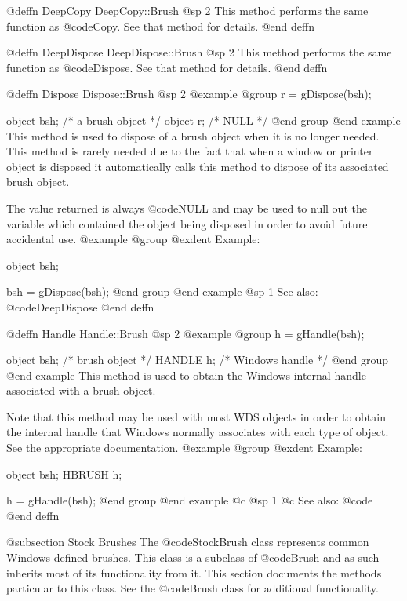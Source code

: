 @deffn {DeepCopy} DeepCopy::Brush
@sp 2
This method performs the same function as @code{Copy}.  See that
method for details.
@end deffn





@deffn {DeepDispose} DeepDispose::Brush
@sp 2
This method performs the same function as @code{Dispose}.  See that
method for details.
@end deffn







@deffn {Dispose} Dispose::Brush
@sp 2
@example
@group
r = gDispose(bsh);

object  bsh;   /*  a brush object  */
object  r;     /*  NULL            */
@end group
@end example
This method is used to dispose of a brush object when it is no longer
needed.  This method is rarely needed due to the fact that when a window
or printer object is disposed it automatically calls this method to
dispose of its associated brush object.

The value returned is always @code{NULL} and may be used to null out
the variable which contained the object being disposed in order to
avoid future accidental use.
@example
@group
@exdent Example:

object  bsh;

bsh = gDispose(bsh);
@end group
@end example
@sp 1
See also:  @code{DeepDispose}
@end deffn






@deffn {Handle} Handle::Brush
@sp 2
@example
@group
h = gHandle(bsh);

object  bsh;    /*  brush object    */
HANDLE  h;      /*  Windows handle  */
@end group
@end example
This method is used to obtain the Windows internal handle associated with
a brush object.  

Note that this method may be used with most WDS objects in order to obtain
the internal handle that Windows normally associates with each type of object.
See the appropriate documentation.
@example
@group
@exdent Example:

object  bsh;
HBRUSH  h;

h = gHandle(bsh);
@end group
@end example
@c @sp 1
@c See also:  @code{}
@end deffn








@subsection Stock Brushes
The @code{StockBrush} class represents common Windows defined brushes.  This
class is a subclass of @code{Brush} and as such inherits most of its
functionality from it.  This section documents the methods particular to
this class.  See the @code{Brush} class for additional functionality.






